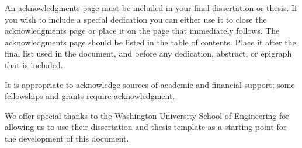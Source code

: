 \documentclass[phdthesis,12pt,final]{wuthesis}
\begin{document}
\frontmatter


\begin{thesistitlepage}
\end{thesistitlepage}

\begin{thesiscopyrightpage}
\end{thesiscopyrightpage}

\begin{singlespace}
\setcounter{page}{2}
\renewcommand*\contentsname{Table of Contents}
\tableofcontents

\cleardoublepage
{}
{}
\listoffigures

\cleardoublepage
{}
{}
\listoftables
\end{singlespace}

\begin{thesisacknowledgments}
An acknowledgments page must be included in your final dissertation or thesis.
If you wish to include a special dedication you can either use it to close the acknowledgments page or place it on the page that immediately follows.
The acknowledgments page should be listed in the table of contents.
Place it after the final list used in the document, and before any dedication, abstract, or epigraph that is included.

It is appropriate to acknowledge sources of academic and financial support; some fellowships and grants require acknowledgment.

We offer special thanks to the Washington University School of Engineering for allowing us to use their dissertation and thesis template as a starting point for the development of this document.
\end{thesisacknowledgments}
\end{document}
